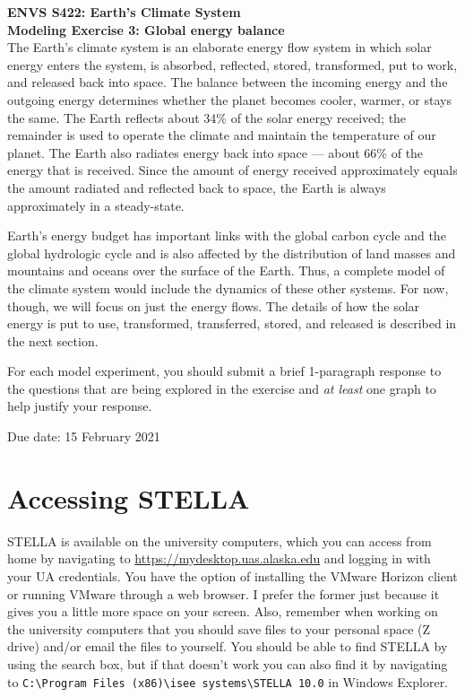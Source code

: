 \documentclass[11pt,letterpaper]{article}
\begin{document}
\textbf{ENVS S422: Earth's Climate System\\
Modeling Exercise 3: Global energy balance}\\%

The Earth's climate system is an elaborate energy flow system in which solar energy enters the system, is absorbed,
reflected, stored, transformed, put to work, and released back into space. The balance between the incoming energy and the
outgoing energy determines whether the planet becomes cooler, warmer, or stays the same. The Earth reflects about 34\% of the solar
energy received; the remainder is used to operate the climate and maintain the temperature of our planet. The Earth also radiates energy
back into space --- about 66\% of the energy that is received. Since the amount of energy received approximately equals the amount radiated and reflected back to space, the Earth is always approximately in a steady-state.

Earth's energy budget has important links with the global carbon cycle and the global hydrologic cycle and is also affected by
the distribution of land masses and mountains and oceans over the surface of the Earth. Thus, a complete model of the
climate system would include the dynamics of these other systems. For now, though, we will focus on just the energy flows. The details of how the solar energy is put to use, transformed, transferred, stored, and released is described in the next section. 

For each model experiment, you should submit a brief 1-paragraph response to the questions that are being explored in the exercise and \textit{at least} one graph to help justify your response.

Due date: 15 February 2021

\section{Accessing STELLA}
STELLA is available on the university computers, which you can access from home by navigating to \url{https://mydesktop.uas.alaska.edu} and logging in with your UA credentials. You have the option of installing the VMware Horizon client or running VMware through a web browser. I prefer the former just because it gives you a little more space on your screen. Also, remember when working on the university computers that you should save files to your personal space (Z drive) and/or email the files to yourself. You should be able to find STELLA by using the search box, but if that doesn't work you can also find it by navigating to \verb+C:\Program Files (x86)\isee systems\STELLA 10.0+ in Windows Explorer.
\end{document}
